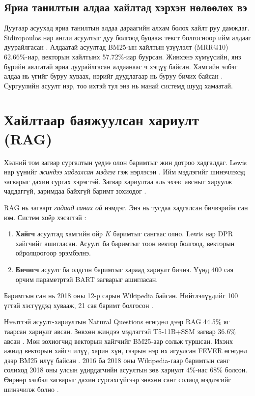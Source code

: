 \subsection{Яриа танилтын алдаа хайлтад хэрхэн нөлөөлөх вэ}

Дуугаар асуухад яриа танилтын алдаа дараагийн алхам болох хайлт руу дамждаг. Sidiropoulos нар англи асуултыг дуу болгоод буцааж текст болгосноор ийм алдааг дуурайлгасан \cite{sidiropoulos2022asr}. Алдаатай асуултад BM25-ын хайлтын үзүүлэлт (MRR@10) 62.66\%-иар, векторын хайлтынх 57.72\%-иар буурсан. Жинхэнэ хүмүүсийн, янз бүрийн аялгатай яриа дуурайлгасан алдаанаас ч хэцүү байсан. Хамгийн элбэг алдаа нь үгийг буруу хуваах, нэрийг дуудлагаар нь буруу бичих байсан \cite{sidiropoulos2022asr}. Сургуулийн асуулт нэр, тоо ихтэй тул энэ нь манай системд шууд хамаатай.

\section{Хайлтаар баяжуулсан хариулт (RAG)}
\label{sec:lit-rag}

Хэлний том загвар сургалтын үедээ олон баримтыг жин дотроо хадгалдаг. Lewis нар үүнийг \textit{жиндээ хадгалсан мэдлэг} гэж нэрлэсэн \cite{lewis2020rag}. Ийм мэдлэгийг шинэчлэхэд загварыг дахин сургах хэрэгтэй. Загвар хариултаа аль эхээс авсныг харуулж чаддаггүй, заримдаа байхгүй баримт зохиодог \cite{lewis2020rag}.

RAG нь загварт \textit{гадаад санах ой} нэмдэг. Энэ нь тусдаа хадгалсан бичвэрийн сан юм. Систем хоёр хэсэгтэй \cite{lewis2020rag}:
\begin{enumerate}
    \item \textbf{Хайгч} асуултад хамгийн ойр $K$ баримтыг сангаас олно. Lewis нар DPR хайгчийг ашигласан. Асуулт ба баримтыг тоон вектор болгоод, векторын ойролцоогоор эрэмбэлнэ.
    \item \textbf{Бичигч} асуулт ба олдсон баримтыг хараад хариулт бичнэ. Үүнд 400 сая орчим параметртэй BART загварыг ашигласан.
\end{enumerate}
Баримтын сан нь 2018 оны 12-р сарын Wikipedia байсан. Нийтлэлүүдийг 100 үгтэй хэсгүүдэд хувааж, 21 сая баримт болгосон \cite{lewis2020rag}.

Нээлттэй асуулт-хариултын Natural Questions өгөгдөл дээр RAG 44.5\% яг таарсан хариулт авсан. Зөвхөн жиндээ мэдлэгтэй T5-11B+SSM загвар 36.6\% авсан \cite{lewis2020rag}. Мөн зохиогчид векторын хайгчийг BM25-аар сольж туршсан. Ихэнх ажилд векторын хайгч илүү, харин хүн, газрын нэр их агуулсан FEVER өгөгдөл дээр BM25 илүү байсан \cite{lewis2020rag}. 2016 ба 2018 оны Wikipedia-гаар баримтын санг солиход 2018 оны улсын удирдагчийн асуултын зөв хариулт 4\%-иас 68\% болсон. Өөрөөр хэлбэл загварыг дахин сургахгүйгээр зөвхөн санг солиод мэдлэгийг шинэчилж болно \cite{lewis2020rag}.


